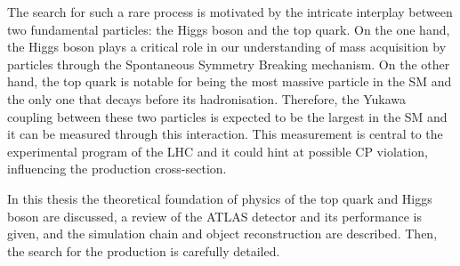The search for such a rare process is motivated by the intricate interplay between two fundamental particles: the Higgs boson and the top quark. On the one hand, the Higgs boson plays a critical role in our understanding  of mass acquisition by particles through the Spontaneous Symmetry Breaking mechanism.
On the other hand, the top quark is notable for being the most massive particle in the SM and the only one that decays before its hadronisation. Therefore, the Yukawa coupling between these two particles is expected  to be the largest in the SM and it can be measured through this interaction.  This measurement is central to the experimental program of the LHC and it could hint at possible CP violation, influencing the \tHq production cross-section.
 
In this thesis the theoretical foundation of physics of the top quark and Higgs boson are discussed, a review of the ATLAS detector and its performance is given, and the simulation chain and object reconstruction are described. Then, the search for the \tHq production is carefully detailed. 

